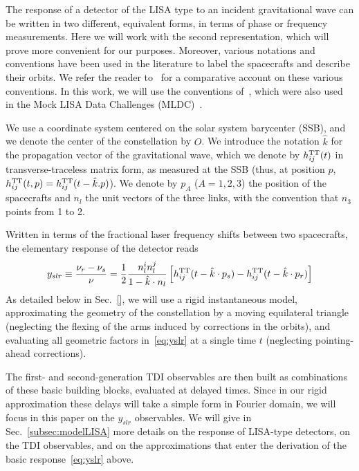 \documentclass[aps,showpacs,%
prd,superscriptaddress,nofootinbib]{revtex4}
\newcommand{\be}{\begin{equation}}
\newcommand{\ee}{\end{equation}}
\begin{document}
The response of a detector of the LISA type to an incident gravitational wave can be written in two different, equivalent forms, in terms of phase or frequency measurements. Here we will work with the second representation, which will prove more convenient for our purposes. Moreover, various notations and conventions have been used in the literature to label the spacecrafts and describe their orbits. We refer the reader to~\cite{Vallisneri04} for a comparative account on these various conventions. In this work, we will use the conventions of~\cite{Vallisneri04}, which were also used in the Mock LISA Data Challenges (MLDC)~\cite{}.

We use a coordinate system centered on the solar system barycenter (SSB), and we denote the center of the constellation by $O$. We introduce the notation $\hat{k}$ for the propagation vector of the gravitational wave, which we denote by $h_{ij}^{\rm TT}(t)$ in transverse-traceless matrix form, as measured at the SSB (thus, at position $p$, $h_{ij}^{\rm TT}(t, p) = h_{ij}^{\rm TT}(t - \hat{k}.p)$). We denote by $p_{A}$ ($A=1,2,3$) the position of the spacecrafts and $n_{l}$ the unit vectors of the three links, with the convention that $n_{3}$ points from 1 to 2.

Written in terms of the fractional laser frequency shifts between two spacecrafts, the elementary response of the detector reads~\cite{EW75, RCP04, Vallisneri04}
\be\label{eq:yslr}
	y_{slr} \equiv \frac{\nu_{r} - \nu_{s}}{\nu} = \frac{1}{2} \frac{n_{l}^{i}n_{l}^{j}}{1 - \hat{k}\cdot n_{l}} \left[ h_{ij}^{\rm TT}(t - \hat{k}\cdot p_{s}) - h_{ij}^{\rm TT}(t - \hat{k}\cdot p_{r}) \right]
\ee
As detailed below in Sec.~\ref{}, we will use a rigid instantaneous model, approximating the geometry of the constellation by a moving equilateral triangle (neglecting the flexing of the arms induced by corrections in the orbits), and evaluating all geometric factors in~\eqref{eq:yslr} at a single time $t$ (neglecting pointing-ahead corrections).

The first- and second-generation TDI observables are then built as combinations of these basic building blocks, evaluated at delayed times. Since in our rigid approximation these delays will take a simple form in Fourier domain, we will focus in this paper on the $y_{slr}$ observables. We will give in Sec.~\ref{subsec:modelLISA} more details on the response of LISA-type detectors, on the TDI observables, and on the approximations that enter the derivation of the basic response~\eqref{eq:yslr} above.
\end{document}
